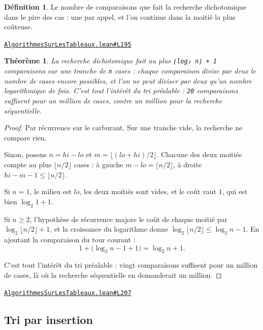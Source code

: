 \documentclass[11pt,a4paper]{article}
\theoremstyle{definition}
\newtheorem{definition}{Définition}
\theoremstyle{plain}
\newtheorem{theoreme}{Théorème}
\newcommand{\source}[2]{\par\smallskip\noindent\hfill{\footnotesize\href{#1}{\texttt{#2}}}\par\smallskip}
\begin{document}
\begin{definition}
Le nombre de comparaisons que fait la recherche dichotomique dans le pire des
cas : une par appel, et l'on continue dans la moitié la plus coûteuse.
\end{definition}
\source{https://github.com/Commutator-IO/learn-lean/blob/main/courses/02-lycee/11-informatique-nsi/AlgorithmesSurLesTableaux.lean\#L195}{AlgorithmesSurLesTableaux.lean\#L195}

\begin{theoreme}
La recherche dichotomique fait au plus \texttt{⌊log₂ n⌋ + 1} comparaisons sur une
tranche de \texttt{n} cases : chaque comparaison divise par deux le nombre de cases encore
possibles, et l'on ne peut diviser par deux qu'un nombre logarithmique de fois. C'est
tout l'intérêt du tri préalable : \texttt{20} comparaisons suffisent pour un million de
cases, contre un million pour la recherche séquentielle.
\end{theoreme}
\begin{proof}
Par récurrence sur le carburant. Sur une tranche vide, la recherche ne compare rien.

Sinon, posons \(n = hi - lo\) et \(m = \lfloor (lo+hi)/2 \rfloor\). Chacune des deux
moitiés compte au plus \(\lfloor n/2 \rfloor\) cases : à gauche
\(m - lo = \lfloor n/2 \rfloor\), à droite \(hi - m - 1 \le \lfloor n/2 \rfloor\).

Si \(n = 1\), le milieu est \(lo\), les deux moitiés sont vides, et le coût vaut \(1\),
qui est bien \(\log_2 1 + 1\).

Si \(n \ge 2\), l'hypothèse de récurrence majore le coût de chaque moitié par
\(\log_2 \lfloor n/2 \rfloor + 1\), et la croissance du logarithme donne
\(\log_2 \lfloor n/2 \rfloor \le \log_2 n - 1\). En ajoutant la comparaison du tour
courant :
\[ 1 + \bigl(\log_2 n - 1 + 1\bigr) = \log_2 n + 1 . \]

C'est tout l'intérêt du tri préalable : vingt comparaisons suffisent pour un million de
cases, là où la recherche séquentielle en demanderait un million.
\end{proof}
\source{https://github.com/Commutator-IO/learn-lean/blob/main/courses/02-lycee/11-informatique-nsi/AlgorithmesSurLesTableaux.lean\#L207}{AlgorithmesSurLesTableaux.lean\#L207}

\subsection{Tri par insertion}
\end{document}

